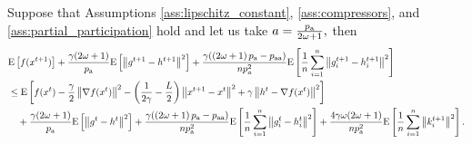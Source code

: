 \documentclass{article}
\newcommand*{\probavailable}{\ensuremath{p_{\textnormal{a}}}}
\newcommand*{\probpairaa}{\ensuremath{p_{\textnormal{aa}}}}
\begin{document}
\begin{lemma}
  \label{lemma:main_lemma}
  Suppose that Assumptions \ref{ass:lipschitz_constant}, \ref{ass:compressors}, and \ref{ass:partial_participation} hold and let us take $a = \frac{\probavailable}{2 \omega + 1},$ then
  \begin{align*}
    &\Exp{f(x^{t + 1})} + \frac{\gamma (2 \omega + 1)}{\probavailable} \Exp{\norm{g^{t+1} - h^{t+1}}^2} + \frac{\gamma (\left(2 \omega + 1\right)\probavailable - \probpairaa)}{n \probavailable^2} \Exp{\frac{1}{n}\sum_{i=1}^n\norm{g^{t+1}_i - h^{t+1}_i}^2}\\
    &\leq \Exp{f(x^t) - \frac{\gamma}{2}\norm{\nabla f(x^t)}^2 - \left(\frac{1}{2\gamma} - \frac{L}{2}\right)
    \norm{x^{t+1} - x^t}^2 + \gamma \norm{h^{t} - \nabla f(x^t)}^2}\nonumber\\
    &\quad + \frac{\gamma (2 \omega + 1)}{\probavailable}\Exp{\norm{g^{t} - h^t}^2}+ \frac{\gamma (\left(2 \omega + 1\right)\probavailable - \probpairaa)}{n \probavailable^2}\Exp{\frac{1}{n} \sum_{i=1}^n\norm{g^t_i - h^{t}_i}^2} + \frac{4 \gamma \omega (2 \omega + 1)}{n \probavailable^2} \Exp{\frac{1}{n} \sum_{i=1}^n\norm{k^{t+1}_i}^2}.
  \end{align*}
\end{lemma}
\end{document}
